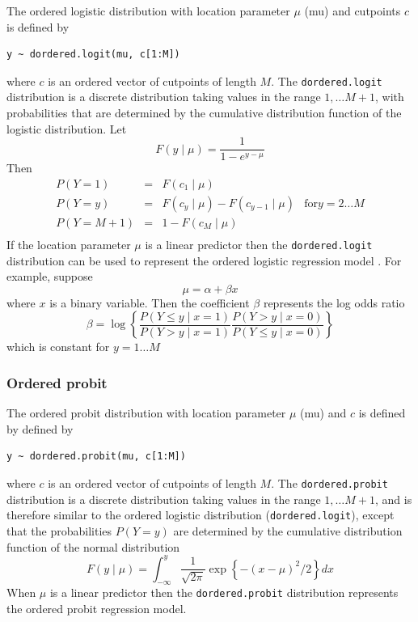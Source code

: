 \documentclass[11pt, a4paper, titlepage]{report}
\begin{document}
The ordered logistic distribution with location parameter $\mu$ (mu)
and cutpoints $c$ is defined by
\begin{verbatim}
y ~ dordered.logit(mu, c[1:M])
\end{verbatim}
where $c$ is an ordered vector of cutpoints of length $M$. The
\texttt{dordered.logit} distribution is a discrete distribution
taking values in the range $1, \ldots M+1$, with probabilities
that are determined by the cumulative distribution function
of the logistic distribution. Let
\[
F(y \mid \mu) = \frac{1}{1 - e^{y-\mu}}
\]
Then
\[
\begin{array}{lcll}
  P(Y = 1) & = & F(c_1 \mid \mu) & \\
  P(Y = y) & = & F(c_{y} \mid \mu) - F(c_{y-1} \mid \mu) & \text{for} y=2 \ldots M \\
  P(Y = M+1) & = & 1 - F(c_M \mid \mu) & \\
\end{array}
\]
If the location parameter $\mu$ is a linear predictor then the
\texttt{dordered.logit} distribution can be used to represent the
ordered logistic regression model \citep{McCullagh1980}. For example,
suppose
\[
\mu = \alpha + \beta x
\]
where $x$ is a binary variable. Then the coefficient $\beta$
represents the log odds ratio
\[
\beta = \log
\left\{
\frac{P\left(Y \leq y \mid x=1\right)}{P\left(Y > y \mid x=1\right)}
\frac{P\left(Y > y \mid x=0\right)}{P\left(Y \leq y \mid x=0\right)}
\right\}
\]
which is constant for $y = 1 \ldots M$
     

\subsubsection{Ordered probit}

The ordered probit distribution with location parameter $\mu$ (mu)
and $c$ is defined by
defined by
\begin{verbatim}
y ~ dordered.probit(mu, c[1:M])
\end{verbatim}
where $c$ is an ordered vector of cutpoints of length $M$. The
\texttt{dordered.probit} distribution is a discrete distribution taking
values in the range $1, \ldots M+1$, and is therefore similar to the ordered
logistic distribution (\texttt{dordered.logit}), except that
the probabilities $P(Y=y)$ are determined by the cumulative
distribution function of the normal distribution
\[
F(y \mid \mu) = \int_{-\infty}^y \frac{1}{\sqrt{2\pi}}
\exp\left\{ -(x - \mu)^2 /2 \right\} dx
\]
When $\mu$ is a linear predictor then the \texttt{dordered.probit}
distribution represents the ordered probit regression model.
\end{document}
